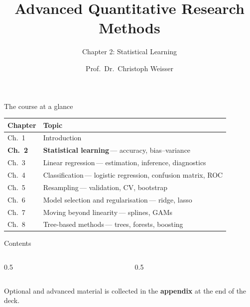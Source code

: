 \documentclass[aspectratio=169,11pt]{beamer}
\title{Advanced Quantitative Research Methods}
\subtitle{Chapter 2: Statistical Learning}
\author{Prof.\ Dr.\ Christoph Weisser}
\date{}\graphicspath{{images/}}
\begin{document}
\begin{frame}[plain]\titlepage\end{frame}

\begin{frame}{The course at a glance}
  \vspace{-1.5mm}
  \begin{center}
  \scriptsize
  \setlength{\tabcolsep}{5pt}
  \renewcommand{\arraystretch}{1.30}
  \begin{tabular}{@{\hspace{2pt}}l >{\raggedright\arraybackslash}p{}@{\hspace{2pt}}}
    \toprule
    \textbf{Chapter} & \textbf{Topic} \\
    \midrule
     {\color{accent}Ch.\ 1} & Introduction \\
    \rowcolor{accent!18} \textbf{Ch.\ 2} & \textbf{Statistical learning}\,{\color{accent!75!black}--- accuracy, bias--variance} \\
     {\color{accent}Ch.\ 3} & Linear regression\,{\color{black!45}--- estimation, inference, diagnostics} \\
    \rowcolor{black!3} {\color{accent}Ch.\ 4} & Classification\,{\color{black!45}--- logistic regression, confusion matrix, ROC} \\
     {\color{accent}Ch.\ 5} & Resampling\,{\color{black!45}--- validation, CV, bootstrap} \\
    \rowcolor{black!3} {\color{accent}Ch.\ 6} & Model selection and regularisation\,{\color{black!45}--- ridge, lasso} \\
     {\color{accent}Ch.\ 7} & Moving beyond linearity\,{\color{black!45}--- splines, GAMs} \\
    \rowcolor{black!3} {\color{accent}Ch.\ 8} & Tree-based methods\,{\color{black!45}--- trees, forests, boosting} \\
    \bottomrule
  \end{tabular}
  \end{center}
\end{frame}


\begin{frame}{Contents}
  \begin{columns}[t]
    \begin{column}{0.5\textwidth}
      \tableofcontents[hideallsubsections,sections={1-6}]
    \end{column}
    \begin{column}{0.5\textwidth}
      \tableofcontents[hideallsubsections,sections={7-11}]
    \end{column}
  \end{columns}
  \vfill
  {\tiny Optional and advanced material is collected in the \textbf{appendix} at the end of the deck.}
\end{frame}
\end{document}
